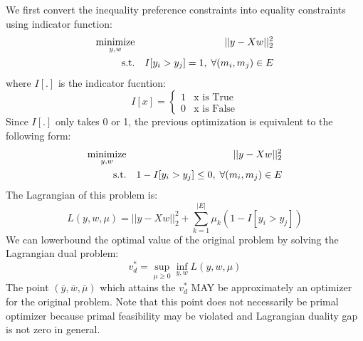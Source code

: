 \documentclass{sig-alternate}
\begin{document}
We first convert the inequality preference constraints 
into equality constraints using indicator function:
\begin{eqnarray}
	\operatorname*{minimize}_{y,w} && ||y - Xw||_2^2 \\
		\text{s.t.} && I[y_i > y_j] = 1, \; \forall (m_i,m_j) \in E
\end{eqnarray}
where $I[.]$ is the indicator fucntion:
\begin{equation}
	I[x] = \left\lbrace 
	\begin{matrix}
		1 & \text{x is True} \\
		0 & \text{x is False}
	\end{matrix}
	\right.
\end{equation}
Since $I[.]$ only takes 0 or 1, 
the previous optimization is equivalent to the following form:
\begin{eqnarray}
	\operatorname*{minimize}_{y,w} && ||y - Xw||_2^2 \\
	\text{s.t.} && 1 - I[y_i > y_j] \le 0, \; \forall (m_i,m_j) \in E
\end{eqnarray}
The Lagrangian of this problem is:
\begin{equation}
	L(y,w,\mu) = ||y - Xw||_2^2 + \sum_{k=1}^{|E|}\mu_k (1 - I[y_i > y_j])
\end{equation}
We can lowerbound the optimal value of the 
original problem by solving the 
Lagrangian dual problem:
\begin{equation}
	v_d^* = \sup_{\mu \ge 0} \inf_{y,w} L(y,w,\mu)
	\label{eq:lag_supinf}
\end{equation}
The point $(\bar{y}, \bar{w}, \bar{\mu})$ which attains the $v_d^*$ 
MAY be approximately an optimizer for the original problem. 
Note that this point does not necessarily be primal optimizer 
because primal feasibility may be violated 
and Lagrangian duality gap is not zero in general. 
\end{document}
